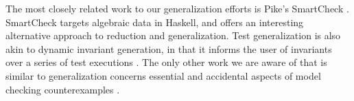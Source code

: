 The most closely related work to our generalization efforts is Pike's
SmartCheck \cite{SmartCheck}.  SmartCheck targets algebraic data in
Haskell, and offers an interesting alternative approach to reduction
and generalization.  Test generalization is also akin to dynamic invariant generation,
in that it informs the user of invariants over a series of test
executions \cite{Daikon}.  The only other work we are aware of that is
similar to generalization concerns essential and accidental aspects of
model checking counterexamples \cite{FreeWill,MakeMost,SPIN03}.  